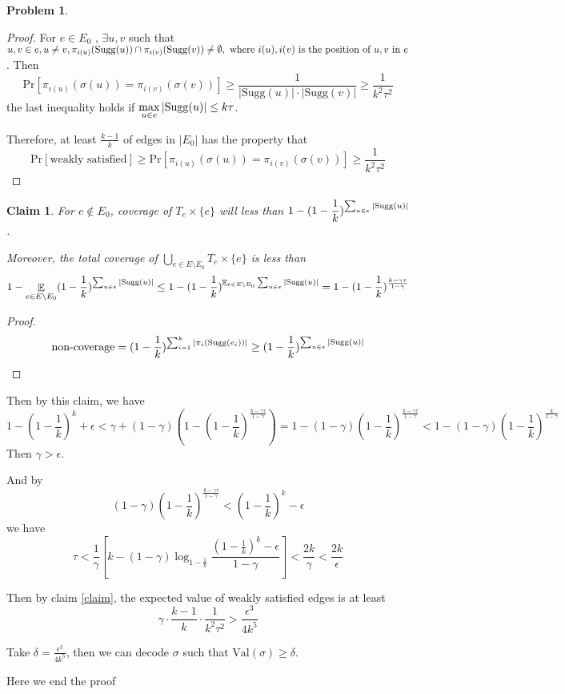 \documentclass[a4paper]{article}
\theoremstyle{definition}
\newtheorem{problem}{Problem}
\theoremstyle{plain}
\newtheorem{claim}[definition]{Claim}
\newcommand{\Ebb}{\mathop\mathbb E}
\newcommand{\dps}{\displaystyle}
\newcommand{\<}{\left<}
\renewcommand{\>}{\right>}
\numberwithin{equation}{problem}
\begin{document}
\begin{problem}
\begin{proof}
      For  $ e\in E_0 $ ,  $ \exists u,v $ such that  $ u,v\in e,u\neq v,\pi_{i(u)}(\mathrm{Sugg}(u))\cap \pi_{i(v)}(\mathrm{Sugg}(v))\neq \emptyset,\text{ where  $ i(u),i(v) $ is the position of  $ u,v $ in  $ e $}   $. Then 
      \[\mathrm{Pr}[\pi_{i(u)}(\sigma(u))=\pi_{i(v)}(\sigma(v))] \geq \frac{1}{|\mathrm{Sugg}(u)|\cdot|\mathrm{Sugg}(v)|} \geq \frac{1}{k^2\tau^2}\]
      the last inequality holds if  $ \dps \max_{u\in e}|\Sugg(u)|  \leq  k\tau $.
      
      Therefore, at least  $ \frac{k-1}{k} $ of edges in  $ |E_0| $ has the property that
      \[\mathrm{Pr}[\text{weakly satisfied}] \geq \mathrm{Pr}[\pi_{i(u)}(\sigma(u))=\pi_{i(v)}(\sigma(v))] \geq \frac{1}{k^2\tau^2}\]
    
    \end{proof}
    \begin{claim}
      For  $ e\not\in E_0 $, coverage of  $ T_e\times\{e\} $ will less than  $ 1-\dps(1-\frac{1}{k})^{\sum_{u\in e}|\Sugg(u)|} $.
      
      Moreover, the total coverage of  $ \dps\bigcup_{e\in E\setminus E_0}T_e\times\{e\} $ is less than 
      \[1-\Ebb_{e\in E\setminus E_0}(1-\frac{1}{k})^{\sum_{u\in e}|\Sugg(u)|} \leq 1-(1-\frac{1}{k})^{\Ebb_{e\in E\setminus E_0}\sum_{u\in e}|\Sugg(u)|}=1-(1-\frac{1}{k})^{\frac{k-\gamma\tau}{1-\gamma}}\] 
    \end{claim}
    \begin{proof}
      \[\text{non-coverage}=(1-\frac{1}{k})^{\sum_{i=1}^k|\pi_i(\mathrm{Sugg}(e_i))|} \geq (1-\frac{1}{k})^{\sum_{u\in e}|\mathrm{Sugg}(u)|}\]
    \end{proof}
    Then by this claim, we have 
    \[1-(1-\frac{1}{k})^k+\epsilon<\gamma+(1-\gamma)(1-(1-\frac{1}{k})^{\frac{k-\gamma\tau}{1-\gamma}})=1-(1-\gamma)(1-\frac{1}{k})^{\frac{k-\gamma\tau}{1-\gamma}}<1-(1-\gamma)(1-\frac{1}{k})^{\frac{k}{1-\gamma}}\]
    Then  $ \gamma>\epsilon $.
    
    And by 
    \[(1-\gamma)(1-\frac{1}{k})^{\frac{k-\gamma\tau}{1-\gamma}}<(1-\frac{1}{k})^k-\epsilon\]
    we have 
    \[\tau<\frac{1}{\gamma}\left[k-(1-\gamma)\log_{1-\frac{1}{k}}\frac{(1-\frac1k)^k-\epsilon}{1-\gamma}\right]<\frac{2k}{\gamma}<\frac{2k}{\epsilon}\]

    Then by claim \ref{claim}, the expected value of weakly satisfied edges is at least
    \[\gamma\cdot \frac{k-1}{k}\cdot\frac{1}{k^2\tau^2}>\frac{\epsilon ^3}{4k^5}\]

    Take  $ \delta=\frac{\epsilon ^3}{4k^5} $, then  we can decode $ \sigma $ such that  $ \mathrm{Val}(\sigma)\geq \delta $.
    
    Here we end the proof



\end{problem}
\end{document}
